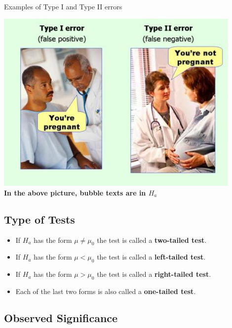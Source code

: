 \begin{example}
Examples of Type I and Type II errors
\begin{center}
  \includegraphics[width=0.9\textwidth]{Figures/type-i-and-type-ii-errors.jpg}\\
  \textbf{In the above picture, bubble texts are in \(H_a\)}
\end{center}
\end{example}
\vspace*{\baselineskip}

\hypertarget{type-of-tests}{%
\subsection{Type of Tests}\label{type-of-tests}}

\begin{itemize}
\item
  If \(H_a\) has the form \(\mu\neq \mu_0\) the test is called a
  \textbf{two-tailed test}.
\item
  If \(H_a\) has the form \(\mu<\mu_0\) the test is called a
  \textbf{left-tailed test}.
\item
  If \(H_a\) has the form \(\mu>\mu_0\) the test is called a
  \textbf{right-tailed test}.
\item
  Each of the last two forms is also called a \textbf{one-tailed test}.
\end{itemize}

\hypertarget{observed-significance}{%
\subsection{Observed Significance}\label{observed-significance}}

